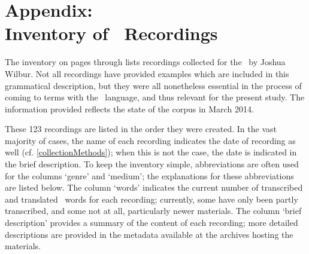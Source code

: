 %



\appendix%
\chapter*{Appendix: \\Inventory of \PS\ Recordings}
\label{inventory}\hypertarget{inventoryRef}{}
The inventory on pages \pageref{inventoryBegin} through \pageref{inventoryEnd} 
lists recordings collected for the \PSDP\ by Joshua Wilbur. Not all recordings have provided examples which are included in this grammatical description, but they were all nonetheless essential in the process of coming to terms with the \PS\ language, and thus relevant for the present study. 
The information provided reflects the state of the corpus in March 2014. 

These 123 recordings are listed in the order they were created. In the vast majority of cases, the name of each recording indicates the date of recording as well (cf. \SEC\ref{collectionMethods}); when this is not the case, the date is indicated in the brief description. To keep the inventory simple, %
abbreviations are often used for the columns ‘genre’ and ‘medium’; %
the explanations for these abbreviations are listed below. %
The column ‘words’ indicates the current number of transcribed and translated \PS\ words for each recording; currently, some have only been partly transcribed, and some not at all, particularly newer materials. 
The column ‘brief description’ provides a summary of the content of each recording; more detailed descriptions are provided in the metadata available at the archives hosting the materials. 

